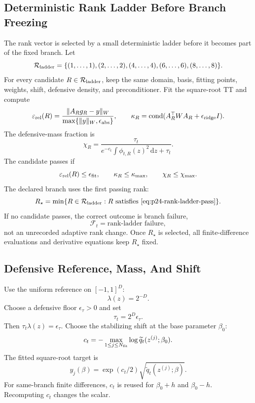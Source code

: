\documentclass[11pt]{article}
\newcommand{\dd}{\,\mathrm d}
\begin{document}
\subsection{Deterministic Rank Ladder Before Branch Freezing}

The rank vector is selected by a small deterministic ladder before it becomes
part of the fixed branch.  Let
\[
    \mathcal R_{\rm ladder}
    =
    \{(1,\ldots,1),(2,\ldots,2),(4,\ldots,4),(6,\ldots,6),(8,\ldots,8)\}.
    \label{eq:p24-rank-ladder}
\]
For every candidate \(R\in\mathcal R_{\rm ladder}\), keep the same domain,
basis, fitting points, weights, shift, defensive density, and preconditioner.
Fit the square-root TT and compute
\[
    \varepsilon_{\rm rel}(R)
    =
    \frac{\|A_R g_R-y\|_W}{\max\{\|y\|_W,\epsilon_{\rm abs}\}},
    \qquad
    \kappa_R
    =
    \operatorname{cond}(A_R^\top W A_R+\epsilon_{\rm ridge}I).
    \label{eq:p24-rank-ladder-residual}
\]
The defensive-mass fraction is
\[
    \chi_R
    =
    \frac{\tau_t}
         {e^{-c_t}\int \phi_{t,R}(z)^2\dd z+\tau_t}.
    \label{eq:p24-rank-ladder-defense}
\]
The candidate passes if
\[
    \varepsilon_{\rm rel}(R)\le \epsilon_{\rm fit},
    \qquad
    \kappa_R\le \kappa_{\max},
    \qquad
    \chi_R\le \chi_{\max}.
    \label{eq:p24-rank-ladder-pass}
\]
The declared branch uses the first passing rank:
\[
    R_\star=\min\{R\in\mathcal R_{\rm ladder}:R\text{ satisfies }
    \eqref{eq:p24-rank-ladder-pass}\}.
    \label{eq:p24-rank-ladder-choice}
\]
If no candidate passes, the correct outcome is branch failure,
\[
    \mathcal F_t=\text{rank-ladder failure},
    \label{eq:p24-rank-ladder-failure}
\]
not an unrecorded adaptive rank change.  Once \(R_\star\) is selected, all
finite-difference evaluations and derivative equations keep \(R_\star\) fixed.

\subsection{Defensive Reference, Mass, And Shift}

Use the uniform reference on \([-1,1]^D\):
\[
    \lambda(z)=2^{-D}.
    \label{eq:p24-c7}
\]
Choose a defensive floor \(\epsilon_\tau>0\) and set
\[
    \tau_t=2^D\epsilon_\tau.
    \label{eq:p24-c8}
\]
Then \(\tau_t\lambda(z)=\epsilon_\tau\).  Choose the stabilizing shift at the
base parameter \(\beta_0\):
\[
    c_t=-\max_{1\le j\le N_{\rm fit}}
    \log \widetilde q_t(z^{(j)};\beta_0).
    \label{eq:p24-c9}
\]
The fitted square-root target is
\[
    y_j(\beta)=\exp(c_t/2)\sqrt{\widetilde q_t(z^{(j)};\beta)}.
    \label{eq:p24-c10}
\]
For same-branch finite differences, \(c_t\) is reused for
\(\beta_0+h\) and \(\beta_0-h\).  Recomputing \(c_t\) changes the scalar.
\end{document}
